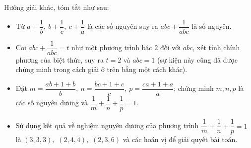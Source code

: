 \begin{bt}
{\begin{nx}
Hướng giải khác, tóm tắt như sau:
\begin{itemize}
	\item Từ $ a + \dfrac{1}{b}, \ b + \dfrac{1}{c}, \ c + \dfrac{1}{a} $ là các số nguyên suy ra $ abc + \dfrac{1}{abc} $ là số nguyên.
	\item Coi $ abc + \dfrac{1}{abc} = t $ như một phương trình bậc $ 2 $ đối với $ abc $, xét tính chính phương của biệt thức, suy ra $ t = 2 $ và $ abc = 1 $ (sự kiện này cũng đã được chứng minh trong cách giải ở trên bằng một cách khác).
	\item Đặt $ m = \dfrac{ab + 1 + b}{b}, \ n = \dfrac{bc + 1 + c}{c}, \ p  = \dfrac{ca + 1 + a}{a}  $; chứng minh $ m, n, p $ là các số nguyên dương và $ \dfrac{1}{m} + \dfrac{1}{n} + \dfrac{1}{p} = 1 $.
	\item Sử dụng kết quả về nghiệm nguyên dương của phương trình $ \dfrac{1}{m} + \dfrac{1}{n} + \dfrac{1}{p} = 1 $ là $ (3,3,3),$ $ (2,4,4),$ $(2,3,6) $ và các hoán vị để giải quyết bài toán.
\end{itemize}	
\end{nx}
}
\end{bt}


